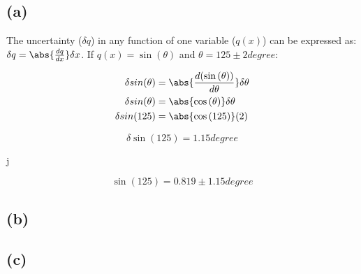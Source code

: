\documentclass[12pt]{article}
\begin{document}
\subsection*{(a)}

The uncertainty (\( \delta q \)) in any function of one variable (\( q(x) \))
can be expressed as: \( \delta q = \abs{\frac{dq}{dx}} \delta x \). If \( q(x) =
\sin{(\theta)} \) and \( \theta = 125 \pm 2 \si{degree} \):

\begin{align*}
  \delta sin{(\theta)} ={}& \abs{\frac{d(\sin{(\theta)})}{d \theta}} \delta
                               \theta \\
  \delta sin{(\theta)} ={}& \abs{\cos{(\theta)}} \delta \theta \\
  \delta sin{(125)} ={}& \abs{\cos{(125)}} (2) \\
\end{align*} 

\begin{tcolorbox}[title=The uncertainty of \( \sin{(125)} \).]
  \[ \delta \sin{(125)} = 1.15 \si{degree} \]
\end{tcolorbox}
j
\begin{tcolorbox}[title=The value of \( \sin{(\theta)} \) where 
  \( \theta = 125 \pm 2 \si{degree} \).]
  \[ \sin{(125)} = 0.819 \pm 1.15 \si{degree} \]
\end{tcolorbox}

\subsection{(b)}



\subsection{(c)}















\end{document}
